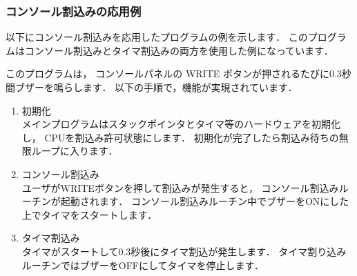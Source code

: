 \subsubsection{コンソール割込みの応用例}

以下にコンソール割込みを応用したプログラムの例を示します．
このプログラムはコンソール割込みとタイマ割込みの両方を使用した例になっています．

このプログラムは，
コンソールパネルの WRITE ボタンが押されるたびに0.3秒間ブザーを鳴らします．
以下の手順で，機能が実現されています．

\begin{enumerate}
\item 初期化 \\
メインプログラムはスタックポインタとタイマ等のハードウェアを初期化し，
CPUを割込み許可状態にします．
初期化が完了したら割込み待ちの無限ループに入ります．

\item コンソール割込み \\
ユーザがWRITEボタンを押して割込みが発生すると，
コンソール割込みルーチンが起動されます．
コンソール割込みルーチン中でブザーをONにした上でタイマをスタートします．

\item タイマ割込み \\
タイマがスタートして0.3秒後にタイマ割込が発生します．
タイマ割り込みルーチンではブザーをOFFにしてタイマを停止します．

\end{enumerate}


